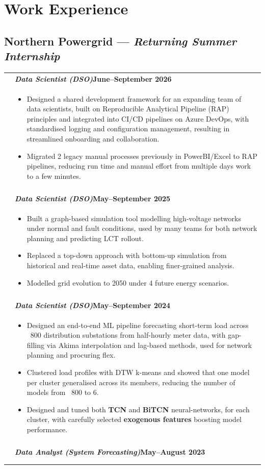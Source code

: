 \documentclass[9pt]{extarticle}
\newcounter{cvcount}
\newcommand{\resetcvcount}{\setcounter{cvcount}{0}}
\newcommand{\timelinedot}{%
    \stepcounter{cvcount}%
    \begin{tikzpicture}[remember picture, overlay, baseline=-0.7ex]
      \node[circle, fill=hg, inner sep=1pt] (currentdot) {};
        \ifnum\value{cvcount}=1
            \node[coordinate] (tls) at (currentdot) {};
        \fi
        \node[coordinate] (tle) at (currentdot) {};
    \end{tikzpicture}%
}
\newcommand{\cventry}[2]{
    \timelinedot & 
    \textbf{#1} \\    
    & \vspace{-4pt}
      \begin{itemize} #2 \end{itemize} \\ 
    \vspace{4pt} & \\ %
}
\begin{document}
\vspace{.4cm}

\begin{minipage}{0.65\textwidth}
	\raggedright

	\section{Work Experience}
	\subsection{\large Northern Powergrid --- \normalsize\textit {Returning Summer Internship}}

	\resetcvcount %
	\begin{tabularx}{\textwidth}{@{} >{\centering}p{1.5em} @{} X @{}}

	\cventry{\textit{Data Scientist (DSO)}\hfill June--September 2026}{\item{Designed a shared development framework for an expanding team of data scientists, built on Reproducible Analytical Pipeline (RAP) principles and integrated into CI/CD pipelines on Azure DevOps, with standardised logging and configuration management, resulting in streamlined onboarding and collaboration.}

	\item Migrated 2 legacy manual processes previously in PowerBI/Excel to RAP pipelines, reducing run time and manual effort from multiple days work to a few minutes.
		}	

		\cventry{\textit{Data Scientist (DSO)}\hfill May--September 2025}
		{
		\item Built a graph-based simulation tool modelling high-voltage networks under normal and fault conditions, used by many teams for both network planning and predicting LCT rollout.
		\item Replaced a top-down approach with bottom-up simulation from historical and real-time asset data, enabling finer-grained analysis.
		\item Modelled grid evolution to 2050 under 4 future energy scenarios.
		}

		\cventry{\textit{Data Scientist (DSO)}\hfill May--September 2024}
		{
		\item Designed an end-to-end ML pipeline forecasting short-term load across ~800 distribution substations from half-hourly meter data, with gap-filling via Akima interpolation and lag-based methods, used for network planning and procuring flex.
			\item Clustered load profiles with DTW k-means and showed that one model per cluster generalised across its members, reducing the number of models from ~800 to 6.			
			\item Designed and tuned both \textbf{TCN} and \textbf{BiTCN} neural-networks, for each cluster, with carefully selected \textbf{exogenous features} boosting model performance.
		}
		\cventry{\textit{Data Analyst (System Forecasting)}\hfill May--August 2023}
		{

}
\end{tabularx}
\end{minipage}
\end{document}
